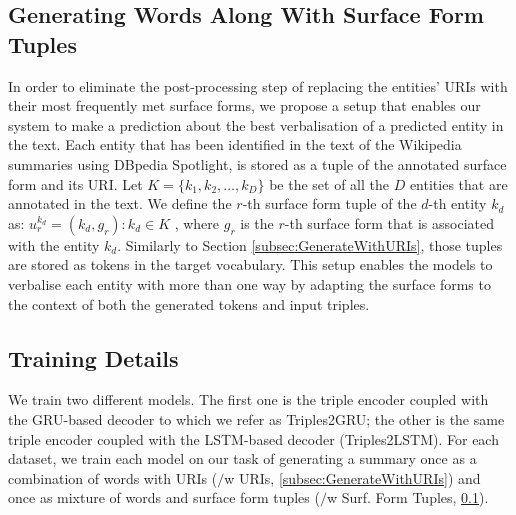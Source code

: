 \documentclass[preprint,5p]{elsarticle}
\begin{document}
\subsection{Generating Words Along With Surface Form Tuples}
\label{subsec:GenerateWithSurfaceFormTuples}
In order to eliminate the post-processing step of replacing the entities' URIs with their most frequently met surface forms, we propose a setup that enables our system to make a prediction about the best verbalisation of a predicted entity in the text. Each entity that has been identified in the text of the Wikipedia summaries using DBpedia Spotlight, is stored as a tuple of the annotated surface form and its URI. Let $K = \{k_1,k_2, \ldots, k_D\}$ be the set of all the $D$ entities that are annotated in the text. We define the $r$-th surface form tuple of the $d$-th entity $k_d$ as: $u_{r}^{k_d}=(k_d, g_r):k_d \in K$ , where $g_r$ is the $r$-th surface form that is associated with the entity $k_d$. Similarly to Section \ref{subsec:GenerateWithURIs}, those tuples are stored as tokens in the target vocabulary. This setup enables the models to verbalise each entity with more than one way by adapting the surface forms to the context of both the generated tokens and input triples.



\subsection{Training Details}

We train two different models. The first one is the triple encoder coupled with the GRU-based decoder to which we refer as Triples2GRU; the other is the same triple encoder coupled with the LSTM-based decoder (Triples2\-LSTM). For each dataset, we train each model on our task of generating a summary once as a combination of words with URIs ($/$w URIs, \ref{subsec:GenerateWithURIs}) and once as mixture of words and surface form tuples ($/$w Surf. Form Tuples, \ref{subsec:GenerateWithSurfaceFormTuples}).
\end{document}
